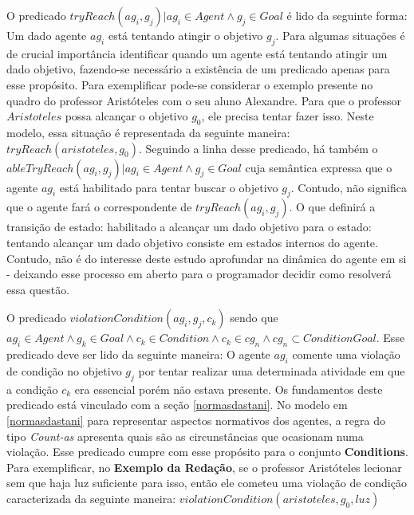 O predicado $tryReach(ag_i,g_j) | ag_i \in Agent \wedge g_j \in Goal $ é lido da seguinte forma: Um dado agente $ag_i$ está tentando 
atingir o objetivo $g_j$. Para algumas situações é de crucial importância identificar quando um agente está tentando atingir um 
dado objetivo, fazendo-se necessário a existência de um predicado apenas para esse propósito. Para exemplificar pode-se considerar 
o exemplo presente no quadro do professor Aristóteles com o seu aluno Alexandre. Para que o professor $Aristoteles$ possa alcançar 
o objetivo $g_0$, ele precisa tentar fazer isso. Neste modelo, essa situação é representada da seguinte maneira: $tryReach(aristoteles,g_0)$.
Seguindo a linha desse predicado, há também o $ableTryReach(ag_i,g_j) | ag_i \in Agent \wedge g_j \in Goal$ cuja semântica expressa que o agente $ag_i$ está habilitado para tentar buscar o objetivo $g_j$. Contudo, não significa que o agente fará o correspondente de $tryReach(ag_i,g_j)$. O que definirá a transição de estado: habilitado a alcançar um dado objetivo para o estado: tentando alcançar um dado objetivo consiste em estados internos do agente. Contudo, não é do interesse deste estudo aprofundar na dinâmica do agente em si - deixando esse processo em aberto para o programador decidir como resolverá essa questão.

O predicado $ violationCondition(ag_i,g_j,c_k) $ sendo que $ ag_i \in Agent \wedge g_k \in Goal \wedge c_k \in Condition \wedge c_k  \in cg_n \wedge cg_n \subset ConditionGoal $. Esse predicado deve ser lido da seguinte maneira: O agente $ag_i$ comente uma violação de condição no objetivo $g_j$ por tentar realizar uma determinada atividade em que a condição $c_k$ era essencial porém não estava presente. Os fundamentos deste predicado está vinculado com a seção \ref{normasdastani}. No modelo em \ref{normasdastani} para representar aspectos normativos dos agentes, a regra do tipo \textit{Count-as} apresenta quais são as circunstâncias que ocasionam numa violação. Esse predicado cumpre com esse propósito para o conjunto \textbf{Conditions}. Para exemplificar, no \textbf{Exemplo da Redação}, se o professor Aristóteles lecionar sem que haja luz suficiente para isso, então ele cometeu uma violação de condição caracterizada da seguinte maneira: $violationCondition(aristoteles,g_0,luz)$

